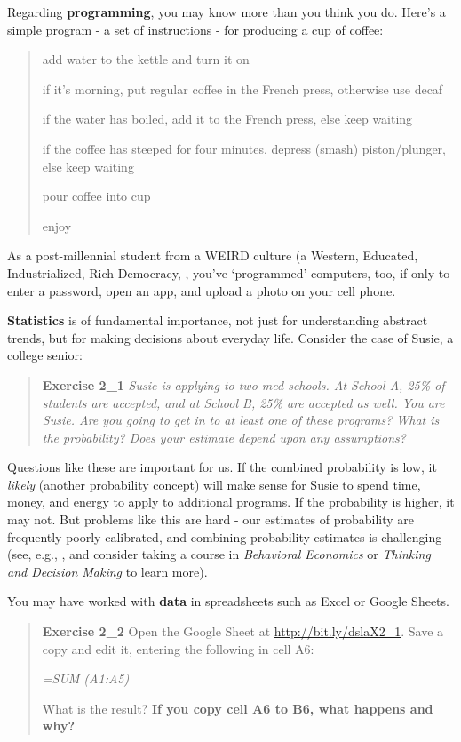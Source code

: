 \documentclass[openany]{book}
\begin{document}
Regarding \textbf{programming}, you may know more than you think you do. Here's a simple program - a set of instructions - for producing a cup of coffee:

\begin{quote}
add water to the kettle and turn it on

if it's morning, put regular coffee in the French press, otherwise use decaf

if the water has boiled, add it to the French press, else keep waiting

if the coffee has steeped for four minutes, depress (smash) piston/plunger, else keep waiting

pour coffee into cup

enjoy
\end{quote}

As a post-millennial student from a WEIRD culture (a Western, Educated, Industrialized, Rich Democracy, \citet{henrich2010weirdest}, you've `programmed' computers, too, if only to enter a password, open an app, and upload a photo on your cell phone.

\textbf{Statistics} is of fundamental importance, not just for understanding abstract trends, but for making decisions about everyday life. Consider the case of Susie, a college senior:

\begin{quote}
\textbf{Exercise 2\_1}
\emph{Susie is applying to two med schools. At School A, 25\% of students are accepted, and at School B, 25\% are accepted as well. You are Susie. Are you going to get in to at least one of these programs? What is the probability? Does your estimate depend upon any assumptions?}
\end{quote}

Questions like these are important for us. If the combined probability is low, it \emph{likely} (another probability concept) will make sense for Susie to spend time, money, and energy to apply to additional programs. If the probability is higher, it may not. But problems like this are hard - our estimates of probability are frequently poorly calibrated, and combining probability estimates is challenging (see, e.g., \citet{tversky1974judgment}, and consider taking a course in \emph{Behavioral Economics} or \emph{Thinking and Decision Making} to learn more).

You may have worked with \textbf{data} in spreadsheets such as Excel or Google Sheets.

\begin{quote}
\textbf{Exercise 2\_2}
Open the Google Sheet at \url{http://bit.ly/dslaX2_1}. Save a copy and edit it, entering the following in cell A6:

\emph{=SUM (A1:A5)}

What is the result? \textbf{If you copy cell A6 to B6, what happens and why?}
\end{quote}
\end{document}
